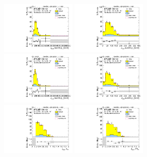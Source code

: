 \begin{figure}[htbp!]
\begin{center}
\includegraphics[width=0.32\textwidth,angle=-90]{figures/boosted/Sideband/b77_FourTag_Sideband_leadHCand_trk0_Pt.pdf}
\includegraphics[width=0.32\textwidth,angle=-90]{figures/boosted/Sideband/b77_FourTag_Sideband_leadHCand_trk1_Pt.pdf}\\
\includegraphics[width=0.32\textwidth,angle=-90]{figures/boosted/Sideband/b77_FourTag_Sideband_sublHCand_trk0_Pt.pdf}
\includegraphics[width=0.32\textwidth,angle=-90]{figures/boosted/Sideband/b77_FourTag_Sideband_sublHCand_trk1_Pt.pdf}\\
\includegraphics[width=0.32\textwidth,angle=-90]{figures/boosted/Sideband/b77_FourTag_Sideband_leadHCand_trk_dr.pdf}
\includegraphics[width=0.32\textwidth,angle=-90]{figures/boosted/Sideband/b77_FourTag_Sideband_sublHCand_trk_dr.pdf}

\end{center}
\end{figure}
